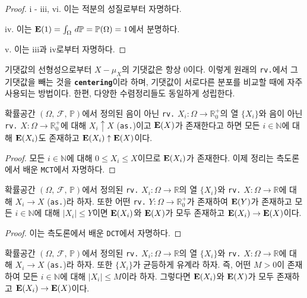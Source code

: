 \begin{proof}
    i - iii, vi. 이는 적분의 성질로부터 자명하다.

    iv. 이는 $\mathbf{E}(1)=\int_\Omega\,d\mathbb{P}=\mathbb{P}(\Omega)=1$에서 분명하다.

    v. 이는 iii과 iv로부터 자명하다.
\end{proof}

기댓값의 선형성으로부터 $X-\mu_X$의 기댓값은 항상 $0$이다. 이렇게 원래의 \texttt{rv.}에서 그 기댓값을 빼는 것을 \textbf{\texttt{centering}}이라 하며, 기댓값이 서로다른 분포를 비교할 때에 자주 사용되는 방법이다. 한편, 다양한 수렴정리들도 동일하게 성립한다.

\begin{theorem}
    확률공간 $(\Omega,\,\mathcal{F},\,\mathbb{P})$에서 정의된 음이 아닌 \texttt{rv.} $X_i:\Omega\to\mathbb{R}^+_0$의 열 $\{X_i\}$와 음이 아닌 \texttt{rv.} $X:\Omega\to\mathbb{R}^+_0$에 대해 $X_i\uparrow X$ (\texttt{as.})이고 $\mathbf{E}(X)$가 존재한다고 하면 모든 $i\in\mathbb{N}$에 대해 $\mathbf{E}(X_i)$도 존재하고 $\mathbf{E}(X_i)\uparrow\mathbf{E}(X)$이다.
\end{theorem}

\begin{proof}
    모든 $i\in\mathbb{N}$에 대해 $0\leq X_i\leq X$이므로 $\mathbf{E}(X_i)$가 존재한다. 이제 정리는 측도론에서 배운 \texttt{MCT}에서 자명하다.
\end{proof}

\begin{theorem}
    확률공간 $(\Omega,\,\mathcal{F},\,\mathbb{P})$에서 정의된 \texttt{rv.} $X_i:\Omega\to\mathbb{R}$의 열 $\{X_i\}$와 \texttt{rv.} $X:\Omega\to\mathbb{R}$에 대해 $X_i\to X$ (\texttt{as.})라 하자. 또한 어떤 \texttt{rv.} $Y:\Omega\to\mathbb{R}^+_0$가 존재하여 $\mathbf{E}(Y)$가 존재하고 모든 $i\in\mathbb{N}$에 대해 $|X_i|\leq Y$이면 $\mathbf{E}(X_i)$와 $\mathbf{E}(X)$가 모두 존재하고 $\mathbf{E}(X_i)\to\mathbf{E}(X)$이다.
\end{theorem}

\begin{proof}
    이는 측도론에서 배운 \texttt{DCT}에서 자명하다.
\end{proof}

\begin{corollary}
    확률공간 $(\Omega,\,\mathcal{F},\,\mathbb{P})$에서 정의된 \texttt{rv.} $X_i:\Omega\to\mathbb{R}$의 열 $\{X_i\}$와 \texttt{rv.} $X:\Omega\to\mathbb{R}$에 대해 $X_i\to X$ (\texttt{as.})라 하자. 또한 $\{X_i\}$가 균등하게 유계라 하자. 즉, 어떤 $M>0$이 존재하여 모든 $i\in\mathbb{N}$에 대해 $|X_i|\leq M$이라 하자. 그렇다면 $\mathbf{E}(X_i)$와 $\mathbf{E}(X)$가 모두 존재하고 $\mathbf{E}(X_i)\to\mathbf{E}(X)$이다.
\end{corollary}

